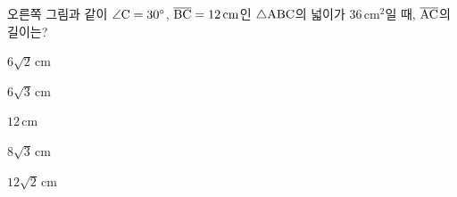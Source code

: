 \noindent\begin{minipage}[t]{0.58\linewidth}\vspace{0pt}\raggedright 오른쪽 그림과 같이 $\angle\mathrm{C}=30^\circ$, $\overline{\mathrm{BC}}=12\,\mathrm{cm}$인 $\triangle\mathrm{ABC}$의 넓이가 $36\,\mathrm{cm}^2$일 때, $\overline{\mathrm{AC}}$의 길이는?\end{minipage}\hfill\begin{minipage}[t]{0.4\linewidth}\vspace{0pt}\centering \resizebox{\ifdim\width>\linewidth\linewidth\else\width\fi}{!}{}\end{minipage}\par
\begin{choicesii}{\rule[-3ex]{0pt}{8ex}$6\sqrt{2}\,\mathrm{cm}$}{\rule[-3ex]{0pt}{8ex}$6\sqrt{3}\,\mathrm{cm}$}{\rule[-3ex]{0pt}{8ex}$12\,\mathrm{cm}$}{\rule[-3ex]{0pt}{8ex}$8\sqrt{3}\,\mathrm{cm}$}{\rule[-3ex]{0pt}{8ex}$12\sqrt{2}\,\mathrm{cm}$}\end{choicesii}
